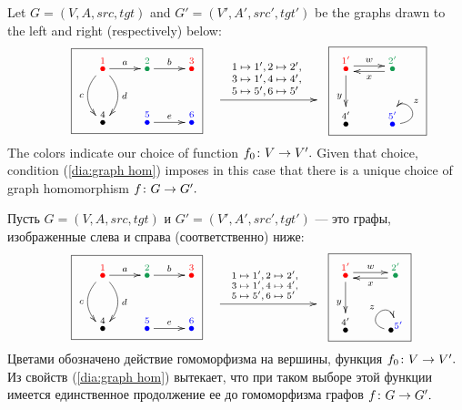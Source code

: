 \documentclass[../main/CT4S-EN-RU]{subfiles}
\begin{document}
\begin{exampleENG}\label{ex:graph hom}
Let $G=(V,A,src,tgt)$ and $G'=(V',A',src',tgt')$ be the graphs drawn to the left and right (respectively) below:
\begin{align}\label{dia:graph hom example}
\parbox{1.5in}{\fbox{\xymatrix{\LMO{\color{red}{1}}\ar[r]^a\ar@/^1pc/[d]^d\ar@/_1pc/[d]_c&\LMO{\color{ForestGreen}{2}}\ar[r]^b&\LMO{\color{red}{3}}\\\LMO{4}&\LMO{\color{blue}{5}}\ar[r]^e&\LMO{\color{blue}{6}}}}}
\parbox{1in}{\xymatrix{~\ar[rr]^{\parbox{.8in}{\vspace{-.2in}\footnotesize$1\mapsto 1', 2\mapsto 2',\\ 3\mapsto 1',4\mapsto 4',\\ 5\mapsto 5',6\mapsto5'$}}&\hsp&~}}
\parbox{.8in}{\fbox{\xymatrix{\LMO{\color{red}{1'}}\ar@<.5ex>[r]^w\ar[d]_y&\LMO{\color{ForestGreen}{2'}}\ar@<.5ex>[l]^x\\\LMO{4'}&\LMO{\color{blue}{5'}}\ar@(r,u)[]_z}}}
\end{align}
The colors indicate our choice of function $f_0\colon V\rightarrow V'.$ Given that choice, condition (\ref{dia:graph hom}) imposes in this case that there is a unique choice of graph homomorphism $f\colon G\rightarrow G'.$ 
\end{exampleENG}

\begin{exampleRUS}\label{ex:graph hom}
Пусть $G=(V,A,src,tgt)$ и $G'=(V',A',src',tgt')$ — это графы, изображенные слева и справа (соответственно) ниже:
\begin{align}\label{dia:graph hom example}
\parbox{1.5in}{\fbox{\xymatrix{
    \LMO{\color{red}{1}} \ar[r]^a \ar@/^1pc/[d]^d \ar@/_1pc/[d]_c  &  \LMO{\color{ForestGreen}{2}} \ar[r]^b  &  \LMO{\color{red}{3}}  \\
    \LMO{4}  &  \LMO{\color{blue}{5}} \ar[r]^e  &  \LMO{\color{blue}{6}}
}}}
\parbox{1in}{\xymatrix{
    ~ \ar[rr]^{\parbox{.8in}{
        \vspace{-.2in}\scriptsize$
        1 \mapsto 1', 2 \mapsto 2',  \\ 
        3 \mapsto 1', 4 \mapsto 4',  \\ 
        5 \mapsto 5', 6 \mapsto 5'  $
    }}  &  \hsp  &  ~
}}
\parbox{.8in}{\fbox{\xymatrix{
    \LMO{\color{red}{1'}} \ar@<.5ex>[r]^w \ar[d]_y  &  \LMO{\color{ForestGreen}{2'}} \ar@<.5ex>[l]^x  \\
    \LMO{4'}  &  \LMOX{\color{blue}{5'}} \ar@(l,u)[]^z
}}}
\end{align}
Цветами обозначено действие гомоморфизма на вершины, функция $f_0\colon V\rightarrow V'.$ Из свойств (\ref{dia:graph hom}) вытекает, что при таком выборе этой функции имеется единственное продолжение ее до гомоморфизма графов $f\colon G\rightarrow G'.$ 
\end{exampleRUS}
\end{document}
